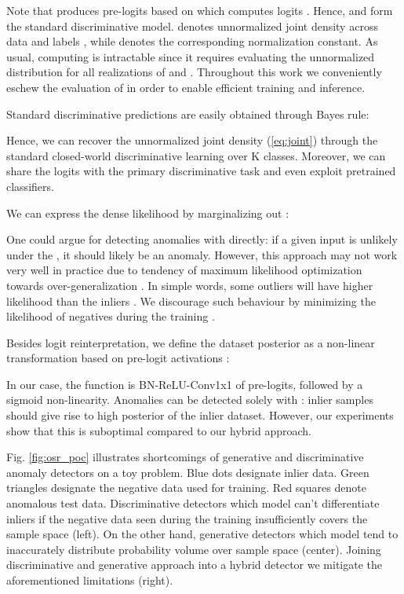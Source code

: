 \documentclass[runningheads]{llncs}
\begin{document}
Note that  produces pre-logits  based on which  computes logits .
Hence,  and  form the standard discriminative model.
 denotes unnormalized joint density across data  and labels , while  denotes the corresponding normalization constant.
As usual, computing  is intractable since it requires evaluating the unnormalized distribution for all realizations of  and .
Throughout this work we conveniently eschew the evaluation of  in order to enable efficient training and inference.

Standard discriminative predictions 
are 
easily obtained through Bayes rule:

Hence, we can recover the unnormalized joint density (\ref{eq:joint}) through the standard closed-world discriminative learning over K classes.
Moreover, we can share the logits with the primary discriminative task and even exploit pretrained classifiers.

We can express the dense likelihood  by marginalizing out :

One could argue for detecting anomalies with  directly:
if a given input is unlikely under the , it should likely be an anomaly.
However, this approach may not work very well in practice due to tendency of maximum likelihood optimization towards over-generalization \cite{lucas19nips}.
In simple words, some outliers will have higher likelihood than the inliers \cite{serra20iclr,nalisnick19iclr}. 
We discourage such behaviour by minimizing the likelihood of negatives during the training \cite{hendrycks19iclr}.

Besides logit reinterpretation, we define the dataset posterior  as a non-linear transformation based on pre-logit activations  \cite{bevandic19gcpr}:

In our case, the function  is BN-ReLU-Conv1x1 of pre-logits, followed by a sigmoid non-linearity.
Anomalies can be detected solely with  \cite{devries18arxiv}: inlier samples should give rise to high posterior of the inlier dataset.
However, our experiments show that this is suboptimal compared to our hybrid approach.

Fig. \ref{fig:osr_poc} illustrates shortcomings of generative and discriminative anomaly detectors on a toy problem.
Blue dots designate inlier data.
Green triangles designate the negative data used for training.
Red squares denote anomalous test data.
Discriminative detectors which model  can't differentiate inliers if the negative data seen during the training insufficiently covers the sample space (left).
On the other hand, generative detectors which model  tend to inaccurately distribute probability volume over sample space \cite{lucas19nips} (center).
Joining discriminative and generative approach into a hybrid detector we mitigate the aforementioned limitations (right).
\end{document}
